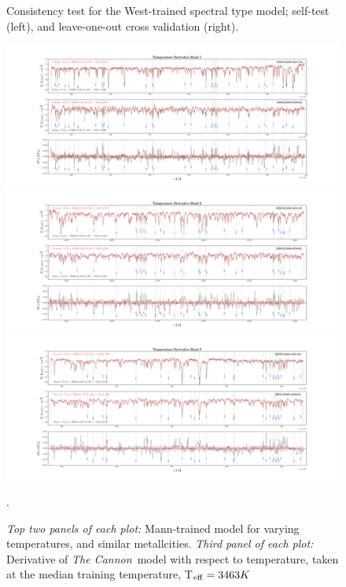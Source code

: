 \documentclass[modern]{aastex62}
\newcommand{\thecannon}{\textsl{The Cannon}}
\begin{document}
\begin{figure}[ht]
\begin{center}
\end{center}
\caption{Consistency test for the West-trained spectral type model; self-test (left), and leave-one-out cross validation (right).} \label{fig:west_validation}
\end{figure}

\begin{figure}[ht]
\begin{center}
\includegraphics[width=16cm]{figures/demo_derivatives_teff1.png}
\includegraphics[width=16cm]{figures/demo_derivatives_teff2.png}
\includegraphics[width=16cm]{figures/demo_derivatives_teff3.png}
\end{center}
\caption{\textit{Top two panels of each plot:} Mann-trained model for varying temperatures, and similar metallcities. \textit{Third panel of each plot:} Derivative of \thecannon\ model with respect to temperature, taken at the median training temperature, T$_{\rm eff}=3463 K$}. \label{fig:demo_teff}
\end{figure}
\end{document}
